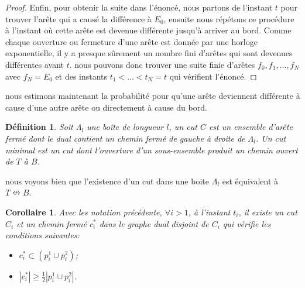 \documentclass[titlepage,a4paper,12pt]{article}
\newcounter{def}
\newcounter{cor}
\newtheorem{cut}[def]{Définition}
\newtheorem{bcut}[cor]{Corollaire}
\newcommand{\nconnect}{\nleftrightarrow}
\begin{document}
\begin{proof}
Enfin, pour obtenir la suite dans l'énoncé, nous partons de l'instant $t$ pour trouver l'arête qui a causé la différence à $E_0$, ensuite nous répétons ce procédure à l'instant où cette arête est devenue différente jusqu'à arriver au bord. Comme chaque ouverture ou fermeture d'une arête est donnée par une horloge exponentielle, il y a presque sûrement un nombre fini d'arêtes qui sont devenues différentes avant $t$. nous pouvons donc trouver une suite finie d'arêtes $f_0,f_1,\dots, f_N$ avec $f_N = E_0$ et des instants $t_1<\dots< t_N = t$ qui vérifient l'énoncé.
\end{proof}

nous estimons maintenant la probabilité pour qu'une arête deviennent différente à cause d'une autre arête ou directement à cause du bord. 

\begin{cut}
Soit $\Lambda_l$ une boîte de longueur $l$, un cut $C$ est un ensemble d'arête fermé dont le dual contient un chemin fermé de gauche à droite de $\Lambda_l$. Un cut minimal est un cut dont l'ouverture d'un sous-ensemble produit un chemin ouvert de $T$ à $B$.
\end{cut}

nous voyons bien que l'existence d'un cut dans une boite $\Lambda_l$ est équivalent à $T\nconnect B$.

\begin{bcut}
Avec les notation précédente, $\forall i>1$, à l'instant $t_i$, il existe un cut $C_i$ et un chemin fermé $c_i^*$ dans le graphe dual disjoint de $C_i$ qui vérifie les conditions suivantes:
\begin{itemize}
\item $c^*_i \subset (p_i^1\cup p_i^2)$;
\item $|c^*_i| \geqslant \frac{1}{2}|p_i^1\cup p_i^2|$.
\end{itemize}
\end{bcut}
\end{document}
